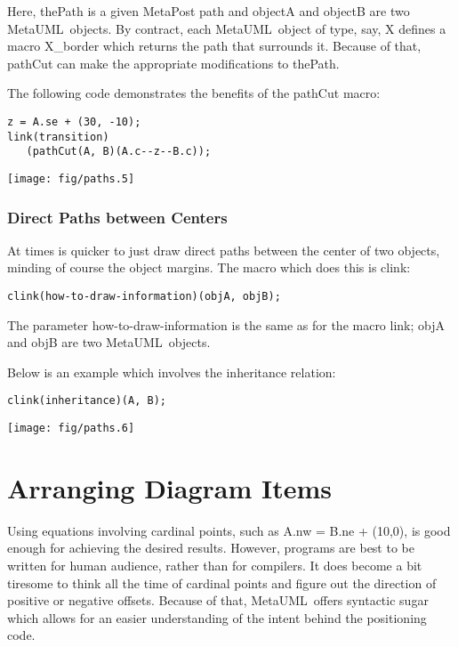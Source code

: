 \documentclass{article}
\newcommand{\code}{\ttfamily}
\newcommand{\metauml}{MetaUML}
\begin{document}
Here, {\code thePath} is a given MetaPost path and {\code objectA} and {\code objectB}
are two \metauml\ objects. By contract, each \metauml\ object of type, say, {\code X}
defines a macro {\code X\_border} which returns the path that surrounds it. Because
of that, {\code pathCut} can make the appropriate modifications to {\code thePath}.

The following code demonstrates the benefits of the {\code pathCut} macro:

\begin{multicols}{2}
\begin{verbatim}
z = A.se + (30, -10);
link(transition)
   (pathCut(A, B)(A.c--z--B.c));
\end{verbatim}
\columnbreak
\hspace{1cm}\texttt{[image: fig/paths.5]}
\end{multicols}

\subsubsection{Direct Paths between Centers}

At times is quicker to just draw direct paths between the center of two objects,
minding of course the object margins. The macro which does this is {\code clink}:

\begin{verbatim}
clink(how-to-draw-information)(objA, objB);
\end{verbatim}

The parameter {\code how-to-draw-information} is the same as for the macro {\code link};
{\code objA} and {\code objB} are two \metauml\ objects.

Below is an example which involves the inheritance relation:

\begin{multicols}{2}
\begin{verbatim}
clink(inheritance)(A, B);
\end{verbatim}
\columnbreak
\hspace{1cm}\texttt{[image: fig/paths.6]}
\end{multicols}

\section{Arranging Diagram Items}
\label{section:positioning}

Using equations involving cardinal points, such as {\code A.nw = B.ne + (10,0)}, is
good enough for achieving the desired results. However, programs are best to
be written for human audience, rather than for compilers. It does become a bit
tiresome to think all the time of cardinal points and figure out the
direction of positive or negative offsets. Because of that, \metauml\ offers
syntactic sugar which allows for an easier understanding of the intent behind
the positioning code.
\end{document}
